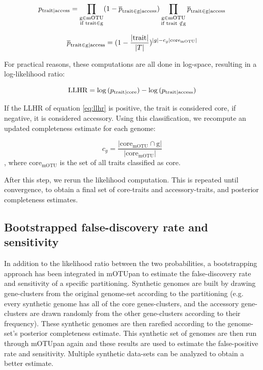 \documentclass{article}
\begin{document}
\begin{equation} \label{eq:access_single}
p_{\textrm{trait\textbar access}}=\prod_{\substack{\textrm{g} \in \textrm{mOTU}\\ \textrm{if trait} \in \textrm{g}}} (1-\overline{p}_{\textrm{trait} \in \textrm{g\textbar access}}) \prod_{\substack{\textrm{g} \in \textrm{mOTU}\\ \textrm{if trait } \notin \textrm{g}}} \overline{p}_{\textrm{trait} \in \textrm{g\textbar access}}
\end{equation}

\begin{equation} \label{eq:access_whole}
\overline{p}_{\textrm{trait} \in \textrm{g\textbar access}}=(1-\frac{|\textrm{trait}|}{|T|})^{|g|-c_g|\textrm{core}_{\textrm{mOTU}}|}
\end{equation}

For practical reasons, these computations are all done in log-space, resulting in a log-likelihood ratio:

\begin{equation} \label{eq:llhr}
\textrm{LLHR}=\log{(p_{\textrm{trait\textbar core}})}-\log{(p_{\textrm{trait\textbar access}})}
\end{equation}

If the $\textrm{LLHR}$ of equation \ref{eq:llhr} is positive, the trait is considered core, if negative, it is considered accessory. Using this classification, we recompute an updated completeness estimate for each genome:

\begin{equation} \label{eq:complete}
c_g=\frac{|\textrm{core}_\textrm{mOTU} \cap \textrm{g}|}{|\textrm{core}_\textrm{mOTU}|}
\end{equation}
%
, where $\textrm{core}_\textrm{mOTU}$ is the set of all traits classified as core.

After this step, we rerun the likelihood computation. This is repeated until convergence, to obtain a final set of core-traits and accessory-traits, and posterior completeness estimates.

\subsection*{Bootstrapped false-discovery rate and sensitivity}

In addition to the likelihood ratio between the two probabilities, a bootstrapping approach has been integrated in mOTUpan to estimate the false-discovery rate and sensitivity of a specific partitioning. Synthetic genomes are built by drawing gene-clusters from the original genome-set according to the partitioning (e.g. every synthetic genome has all of the core genes-clusters, and the accessory gene-clusters are drawn randomly from the other gene-clusters according to their frequency). These synthetic genomes are then rarefied according to the genome-set’s posterior completeness estimate. This synthetic set of genomes are then run through mOTUpan again and these results are used to estimate the false-positive rate and sensitivity. Multiple synthetic data-sets can be analyzed to obtain a better estimate.
\end{document}
